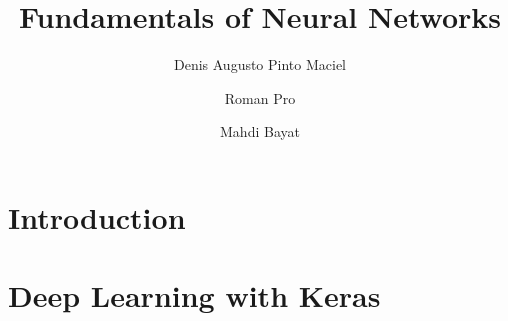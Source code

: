 \documentclass[a4paper, 11pt]{article}
\begin{document}
\title{Fundamentals of Neural Networks}

\author[1]{Denis Augusto Pinto Maciel}
\author[1]{Roman Pro}
\author[1]{Mahdi Bayat}


\maketitle

\begin{abstract}
\blindtext
\end{abstract}

\section{Introduction}
\label{sec:intro}


\section{Deep Learning with Keras}
\label{sec:keras}



\end{document}
